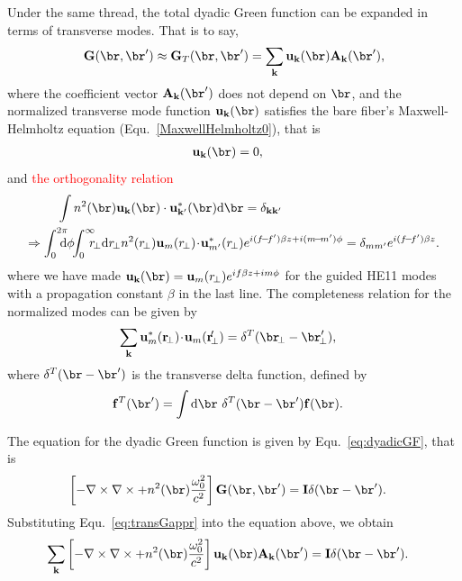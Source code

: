 \documentclass[]{report}
\begin{document}
Under the same thread, the total dyadic Green function can be expanded in terms of transverse modes. That is to say,
\begin{align}
\mathbf{G}(\br,\br')\approx\mathbf{G}_T(\br,\br')= \sum_{\mathbf{k}} \mathbf{u}_{\mathbf{k}}(\br) \mathbf{A}_{\mathbf{k}}(\br'), \label{eq:transGappr}
\end{align}
where the coefficient vector $\mathbf{A}_{\mathbf{k}}(\br')  $ does not depend on $ \br $, and the normalized transverse mode function $ \mathbf{u}_{\mathbf{k}}(\br) $ satisfies the bare fiber's Maxwell-Helmholtz equation (Equ.~\eqref{MaxwellHelmholtz0}), that is
\begin{align}
[-\nabla\times\nabla + \frac{\omega_{\mathbf{k}}^2}{c^2}n^2(\br)]  \mathbf{u}_{\mathbf{k}}(\br) &=0,
\end{align}
and \textcolor{red}{the orthogonality relation}
\begin{align}
\int n^2(\br)  \mathbf{u}_{\mathbf{k}}(\br) \cdot \mathbf{u}^*_{\mathbf{k}'}(\br)\mathrm{d} \br &=\delta_{\mathbf{k}\mathbf{k}'}\\
\Rightarrow \int_0^{2\pi}\!\!\!\!\! \mathrm{d}\phi\!\! \int_0^\infty\!\!\!\! r\!_\perp \mathrm{d}r\!_\perp  n^2(r\!_\perp) \mathbf{u}_{m}(r\!_\perp )\!\cdot\!\mathbf{u}_{m'}^*(r\!_\perp )& e^{i(f\!-\!f')\beta z+i(m\! -\! m')\phi}  =\delta_{mm'}e^{i(f\!-\!f')\beta z} \label{eq:orthutrans}.
\end{align}
where we have made $ \mathbf{u}_{\mathbf{k}}(\br)=\mathbf{u}_{m}(r\!_\perp )e^{if\beta z+im\phi} $ for the guided HE11 modes with a propagation constant $ \beta  $ in the last line. The completeness relation for the normalized modes can be given by
\begin{align}
\sum_{\mathbf{k}} \mathbf{u}^*_{m}(\mathbf{r}\!_\perp )\!\cdot\!\mathbf{u}_{m}(\mathbf{r}\!_\perp^\prime ) &= \delta^T(\br\!_\perp-\br'_{\!\perp}), 
\end{align}
where $ \delta^T(\br-\br') $ is the transverse delta function, defined by
\begin{align}
\mathbf{f}^T(\br')&=\int \mathrm{d}\br\,\, \delta^T(\br-\br')\mathbf{f}(\br).
\end{align} 

The equation for the dyadic Green function is given by Equ.~\eqref{eq:dyadicGF}, that is
\begin{align}
\left[ -\nabla\times\nabla\times + n^2(\br)\frac{\omega_0^2}{c^2} \right] \mathbf{G}(\br,\br') &= \mathbf{I}\delta(\br-\br'). 
\end{align}
Substituting Equ.~\eqref{eq:transGappr} into the equation above, we obtain
\begin{align}
\sum_{\mathbf{k}} \left[ -\nabla\times\nabla\times + n^2(\br)\frac{\omega_0^2}{c^2} \right] \mathbf{u}_{\mathbf{k}}(\br) \mathbf{A}_{\mathbf{k}}(\br') &= \mathbf{I}\delta(\br-\br').
\end{align}
\end{document}
